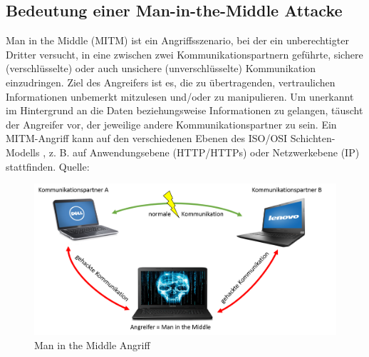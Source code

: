 \subsection{Bedeutung einer Man-in-the-Middle Attacke}
Man in the Middle (MITM) ist ein Angriffsszenario, bei der ein unberechtigter Dritter versucht, in eine zwischen zwei Kommunikationspartnern geführte, sichere (verschlüsselte) oder auch unsichere (unverschlüsselte) Kommunikation einzudringen. Ziel des Angreifers ist es, die zu übertragenden, vertraulichen Informationen unbemerkt mitzulesen und/oder zu manipulieren. Um unerkannt im Hintergrund an die Daten beziehungsweise Informationen zu gelangen, täuscht der Angreifer vor, der jeweilige andere Kommunikationspartner zu sein. Ein MITM-Angriff kann auf den verschiedenen Ebenen des ISO/OSI Schichten-Modells \cite[vgl.]{osi}, z. B. auf Anwendungsebene (HTTP/HTTPs) oder Netzwerkebene (IP) stattfinden. Quelle: \cite[vgl.]{mitm-def}
\begin{figure}[H]
	\centering
	\includegraphics[width=.8\linewidth]{images/MITM.png}
	\caption{Man in the Middle Angriff \cite{mitm-bild}}
\end{figure}
